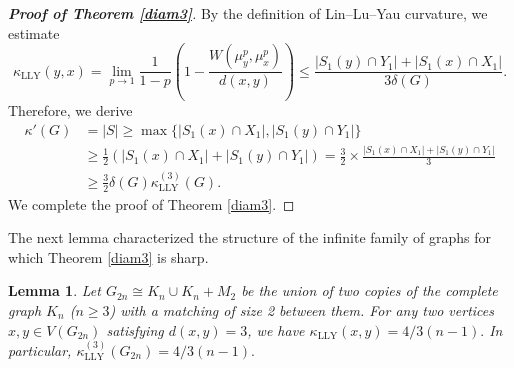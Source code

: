 \documentclass[10pt,a4paper]{article}
\newtheorem{lemma}{Lemma}[section]
\theoremstyle{definition}
\theoremstyle{definition}
\theoremstyle{nonumber}
\begin{document}
\begin{proof}[\bf{Proof of Theorem \ref{diam3}}]
By the definition of Lin--Lu--Yau curvature, we estimate
$$
\kappa_{\mathrm{LLY}}(y, x) = \lim_{p \to 1} \frac{1}{1-p} \left( 1 - \frac{W(\mu_y^p, \mu_x^p)}{d(x, y)} \right) \leq \frac{|S_1(y) \cap Y_1| + |S_1(x) \cap X_1|}{3\delta(G)}.
$$
Therefore, we derive
\begin{align*}
\kappa'(G) &= |S| \geq \max\{|S_1(x) \cap X_1|, |S_1(y) \cap Y_1|\}\\
&\geq \frac{1}{2} (|S_1(x) \cap X_1| + |S_1(y) \cap Y_1|) = \frac{3}{2} \times \frac{|S_1(x) \cap X_1| + |S_1(y) \cap Y_1|}{3}\\
&\geq \frac{3}{2}\delta(G) \kappa_{\mathrm{LLY}}^{(3)}(G).
\end{align*}
We complete the proof of Theorem \ref{diam3}.
\end{proof}

The next lemma characterized the structure of the infinite family of graphs for which Theorem \ref{diam3} is sharp.

\begin{lemma} \label{distance3}
Let $G_{2n}\cong K_n \cup K_n +M_2$ be the union of two copies of the complete graph $K_n$ ($n\geq3$) with a matching of size 2 between them. 
For any two vertices $x,y\in V(G_{2n})$ satisfying $d(x,y)=3$, we have
$\kappa_{\mathrm{LLY}}(x,y)=4/3(n-1).$
In particular, $\kappa_{\mathrm{LLY}}^{(3)}(G_{2n})=4/3(n-1).$
\end{lemma}
\end{document}
